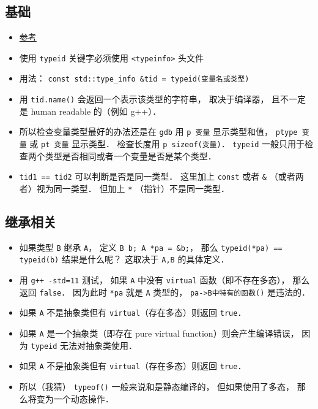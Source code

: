 
\begin{issues}
\issueDraft
\end{issues}

\subsection{基础}
\begin{itemize}
\item \href{https://en.cppreference.com/w/cpp/language/typeid}{参考}
\item 使用 \verb|typeid| 关键字必须使用 \verb|<typeinfo>| 头文件
\item 用法： \verb|const std::type_info &tid = typeid(变量名或类型)|
\item 用 \verb|tid.name()| 会返回一个表示该类型的字符串， 取决于编译器， 且不一定是 human readable 的（例如 g++）．
\item 所以检查变量类型最好的办法还是在 \verb|gdb| 用 \verb|p 变量| 显示类型和值， \verb|ptype 变量| 或 \verb|pt 变量| 显示类型． 检查长度用 \verb|p sizeof(变量)|． \verb|typeid| 一般只用于检查两个类型是否相同或者一个变量是否是某个类型．
\item \verb|tid1 == tid2| 可以判断是否是同一类型． 这里加上 \verb|const| 或者 \verb|&| （或者两者）视为同一类型． 但加上 \verb|*| （指针）不是同一类型．
\end{itemize}

\subsection{继承相关}
\begin{itemize}
\item 如果类型 \verb|B| 继承 \verb|A|， 定义 \verb|B b; A *pa = &b;|， 那么 \verb|typeid(*pa) == typeid(b)| 结果是什么呢？ 这取决于 \verb|A,B| 的具体定义．
\item 用 \verb|g++ -std=11| 测试， 如果 \verb|A| 中没有 \verb|virtual| 函数（即不存在多态）， 那么返回 \verb|false|． 因为此时 \verb|*pa| 就是 \verb|A| 类型的， \verb|pa->B中特有的函数()| 是违法的．
\item 如果 \verb|A| 不是抽象类但有 \verb|virtual|（存在多态）则返回 \verb|true|．
\item 如果 \verb|A| 是一个抽象类（即存在 pure virtual function）则会产生编译错误， 因为 \verb|typeid| 无法对抽象类使用．
\item 如果 \verb|A| 不是抽象类但有 \verb|virtual|（存在多态）则返回 \verb|true|．
\item 所以（我猜） \verb|typeof()| 一般来说和是静态编译的， 但如果使用了多态， 那么将变为一个动态操作．
\end{itemize}
